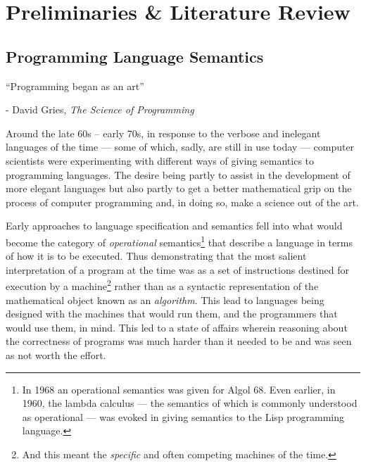\documentclass[oneside,12pt]{article}
\begin{document}
\pagebreak
  
\tableofcontents

\pagebreak

\raggedbottom

\section{Preliminaries \& Literature Review}




\subsection{Programming Language Semantics}

\epigraph{``Programming began as an art''}{ \tiny - David Gries, \emph{The Science of Programming}}


Around the late 60s -- early 70s, in response to the verbose and inelegant languages of the time --- some of which, sadly, are still in use today --- computer scientists were experimenting with different ways of giving semantics to programming languages. The desire being partly to assist in the development of more elegant languages but also partly to get a better mathematical grip on the process of computer programming and, in doing so, make a science out of the art.


Early approaches to language specification and semantics fell into what would become the category of \emph{operational} semantics\footnote{In 1968 an operational semantics was given for Algol 68. Even earlier, in 1960, the lambda calculus --- the semantics of which is commonly understood as operational --- was evoked in giving semantics to the Lisp programming language.}  that describe a language in terms of how it is to be executed. Thus demonstrating that the most salient interpretation of a program at the time was as a set of instructions destined for execution by a machine\footnote{And this meant the \emph{specific} and often competing machines of the time.} rather than as a syntactic representation of the mathematical \mbox{object} known as an \emph{algorithm}. This lead to languages being designed with the machines that would run them, and the programmers that would use them, in mind. This led to a state of affairs wherein reasoning about the correctness of programs was much harder than it needed to be and was seen as not worth the effort.
\end{document}
